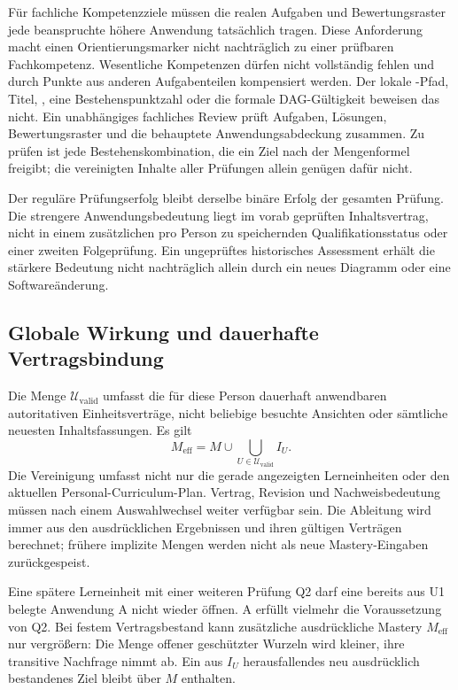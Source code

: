 Für fachliche Kompetenzziele müssen die realen Aufgaben und
Bewertungsraster jede beanspruchte höhere Anwendung tatsächlich tragen.
Diese Anforderung macht einen Orientierungsmarker nicht nachträglich
zu einer prüfbaren Fachkompetenz. Wesentliche Kompetenzen dürfen nicht vollständig
fehlen und durch Punkte aus anderen Aufgabenteilen kompensiert werden.
Der lokale -Pfad, Titel, , eine
Bestehenspunktzahl oder die formale DAG-Gültigkeit beweisen das nicht.
Ein unabhängiges fachliches Review prüft Aufgaben, Lösungen, Bewertungsraster
und die behauptete Anwendungsabdeckung zusammen. Zu prüfen ist jede
Bestehenskombination, die ein Ziel nach der Mengenformel freigibt; die
vereinigten Inhalte aller Prüfungen allein genügen dafür nicht.

Der reguläre Prüfungserfolg bleibt derselbe binäre Erfolg der gesamten
Prüfung. Die strengere Anwendungsbedeutung liegt im vorab geprüften
Inhaltsvertrag, nicht in einem zusätzlichen pro Person zu speichernden
Qualifikationsstatus oder einer zweiten Folgeprüfung.
Ein ungeprüftes historisches Assessment erhält die stärkere Bedeutung
nicht nachträglich allein durch ein neues Diagramm oder eine Softwareänderung.

\subsection{Globale Wirkung und dauerhafte Vertragsbindung}
Die Menge $\mathcal U_{\mathrm{valid}}$ umfasst die für diese Person
dauerhaft anwendbaren autoritativen Einheitsverträge, nicht beliebige
besuchte Ansichten oder sämtliche neuesten Inhaltsfassungen. Es gilt
\[
 M_{\mathrm{eff}}=M\cup
       \bigcup_{U\in\mathcal U_{\mathrm{valid}}}I_U.
\]
Die Vereinigung umfasst nicht nur die gerade angezeigten Lerneinheiten oder den
aktuellen Personal-Curriculum-Plan. Vertrag, Revision und Nachweisbedeutung
müssen nach einem Auswahlwechsel weiter verfügbar sein. Die Ableitung wird
immer aus den ausdrücklichen Ergebnissen und ihren gültigen Verträgen
berechnet; frühere implizite Mengen werden nicht als neue Mastery-Eingaben
zurückgespeist.

Eine spätere Lerneinheit mit einer weiteren Prüfung Q2 darf eine bereits aus U1
belegte Anwendung A nicht wieder öffnen. A erfüllt vielmehr die Voraussetzung
von Q2. Bei festem Vertragsbestand kann zusätzliche ausdrückliche Mastery
$M_{\mathrm{eff}}$ nur vergrößern: Die Menge offener geschützter Wurzeln
wird kleiner, ihre transitive Nachfrage nimmt ab. Ein aus $I_U$
herausfallendes neu ausdrücklich bestandenes Ziel bleibt über $M$ enthalten.

